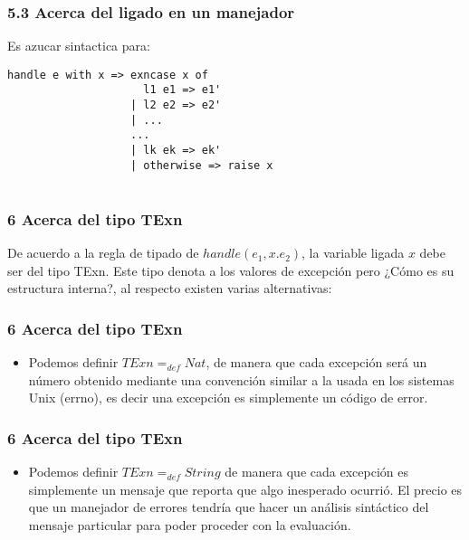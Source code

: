 \documentclass[xcolor=dvipsnames,table,spanish]{beamer}
\begin{document}
\begin{frame}[fragile]
\frametitle{5.3 Acerca del ligado en un manejador}
Es azucar sintactica para:
\begin{example}
\begin{lstlisting}
handle e with x => exncase x of
                     l1 e1 => e1'
                   | l2 e2 => e2'
                   | ...
                   ...
                   | lk ek => ek'
                   | otherwise => raise x


\end{lstlisting}
\end{example}

\end{frame}
\begin{frame}
\frametitle{6 Acerca del tipo TExn}
De acuerdo a la regla de tipado de $handle(e_1,x.e_2)$, la variable ligada $x$ debe ser del tipo TExn. Este tipo denota a los valores de excepción pero ¿Cómo es su estructura interna?, al respecto existen varias alternativas:
\end{frame}

\begin{frame}
\frametitle{6 Acerca del tipo TExn}
\begin{itemize}
\item Podemos definir $TExn =_{def} Nat$, de manera que cada excepción será un número obtenido mediante una convención similar a la usada en los sistemas Unix (errno), es decir una excepción es simplemente un código de error.

\end{itemize}
\end{frame}

\begin{frame}
\frametitle{6 Acerca del tipo TExn}
\begin{itemize}
\item Podemos definir $TExn =_{def} String$ de manera que cada excepción es simplemente un mensaje que reporta que algo inesperado ocurrió. El precio es que un manejador de errores tendría que hacer un análisis sintáctico del mensaje particular para poder proceder con la evaluación.

\end{itemize}
\end{frame}
\end{document}
